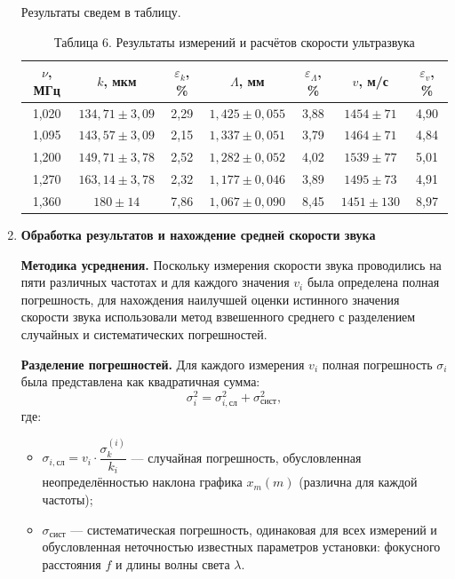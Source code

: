 \documentclass[a4paper]{article}
\begin{document}
\begin{enumerate}
Результаты сведем в таблицу.

\begin{table}[h!]
\centering

\begin{tabular}{|c|c|c|c|c|c|c|}
\hline
$\nu$, МГц & 
$k$, мкм & 
$\varepsilon_k$, \% & 
$\Lambda$, мм & 
$\varepsilon_\Lambda$, \% & 
$v$, м/с & 
$\varepsilon_v$, \% \\
\hline
1,020 & $134{,}71 \pm 3{,}09$ & 2,29 & 
$1{,}425 \pm 0{,}055$ & 3,88 & 
$1454 \pm 71$ & 4,90 \\ \hline
1,095 & $143{,}57 \pm 3{,}09$ & 2,15 & 
$1{,}337 \pm 0{,}051$ & 3,79 & 
$1464 \pm 71$ & 4,84 \\ \hline
1,200 & $149{,}71 \pm 3{,}78$ & 2,52 & 
$1{,}282 \pm 0{,}052$ & 4,02 & 
$1539 \pm 77$ & 5,01 \\ \hline
1,270 & $163{,}14 \pm 3{,}78$ & 2,32 & 
$1{,}177 \pm 0{,}046$ & 3,89 & 
$1495 \pm 73$ & 4,91 \\ \hline
1,360 & $180 \pm 14$ & 7,86 & 
$1{,}067 \pm 0{,}090$ & 8,45 & 
$1451 \pm 130$ & 8,97 \\ \hline
\end{tabular}%

\caption{Таблица 6. Результаты измерений и расчётов скорости ультразвука}
\label{tab:results}
\end{table}

\item \textbf {Обработка результатов и нахождение средней скорости звука}

\textbf {Методика усреднения.} Поскольку измерения скорости звука проводились на пяти различных частотах и для каждого значения $v_i$ была определена полная погрешность, для нахождения наилучшей оценки истинного значения скорости звука использовали метод взвешенного среднего с разделением случайных и систематических погрешностей.

\textbf {Разделение погрешностей.} Для каждого измерения $v_i$ полная погрешность $\sigma_i$ была представлена как квадратичная сумма:
\begin{equation}
    \sigma_i^2 = \sigma_{i,\text{сл}}^2 + \sigma_{\text{сист}}^2,
\end{equation}
где:
\begin{itemize}
    \item $\sigma_{i,\text{сл}} = v_i \cdot \dfrac{\sigma_k^{(i)}}{k_i}$ --- случайная погрешность, обусловленная неопределённостью наклона графика $x_m(m)$ (различна для каждой частоты);
    \item $\sigma_{\text{сист}}$ --- систематическая погрешность, одинаковая для всех измерений и обусловленная неточностью известных параметров установки: фокусного расстояния $f$ и длины волны света $\lambda$.
\end{itemize}


\end{enumerate}
\end{document}
